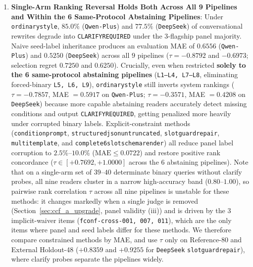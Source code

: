 \documentclass[10pt,twocolumn]{article}
\renewcommand{\_}{\textunderscore\allowbreak}
\begin{document}
\begin{enumerate}[leftmargin=*,nosep]
  \item \textbf{Single-Arm Ranking Reversal Holds Both Across All 9 Pipelines and Within the 6 Same-Protocol Abstaining Pipelines}: Under \texttt{ordinary\_style}, $85.0\%$ (\texttt{Qwen-Plus}) and $77.5\%$ (\texttt{DeepSeek}) of conversational rewrites degrade into \texttt{CLARIFY\_REQUIRED} under the 3-flagship panel majority. Naive seed-label inheritance produces an evaluation MAE of $0.6556$ (\texttt{Qwen-Plus}) and $0.5250$ (\texttt{DeepSeek}) across all $9$ pipelines ($\tau = -0.8792$ and $-0.6973$; selection regret $0.7250$ and $0.6250$). Crucially, even when restricted \textbf{solely to the 6 same-protocol abstaining pipelines} (\texttt{L1--L4, L7--L8}, eliminating forced-binary \texttt{L5, L6, L9}), \texttt{ordinary\_style} still inverts system rankings ($\tau = -0.7857$, MAE $= 0.5917$ on \texttt{Qwen-Plus}; $\tau = -0.3571$, MAE $= 0.4208$ on \texttt{DeepSeek}) because more capable abstaining readers accurately detect missing conditions and output \texttt{CLARIFY\_REQUIRED}, getting penalized more heavily under corrupted binary labels. Explicit-constraint methods (\texttt{condition\_prompt}, \texttt{structured\_json\_untruncated\_320}, \texttt{slot\_guard\_repair}, \texttt{multi\_template\_3}, and \texttt{complete\_6slot\_schema\_render}) all reduce panel label corruption to $2.5\%\text{--}10.0\%$ ($\text{MAE} \le 0.0722$) and restore positive rank concordance ($\tau \in [+0.7692, +1.0000]$ across the 6 abstaining pipelines). Note that on a single-arm set of $39\text{--}40$ determinate binary queries without clarify probes, all nine readers cluster in a narrow high-accuracy band ($0.80\text{--}1.00$), so pairwise rank correlation $\tau$ across all nine pipelines is unstable for these methods: it changes markedly when a single judge is removed (Section~\ref{sec:ccf_a_upgrade}, panel validity (iii)) and is driven by the $3$ implicit-waiver items (\texttt{fconf-cross-001, 007, 011}), which are the only items where panel and seed labels differ for these methods. We therefore compare constrained methods by MAE, and use $\tau$ only on Reference-80 and External Holdout-48 ($+0.8359$ and $+0.9255$ for \texttt{DeepSeek} \texttt{slot\_guard\_repair}), where clarify probes separate the pipelines widely.

\end{enumerate}
\end{document}
